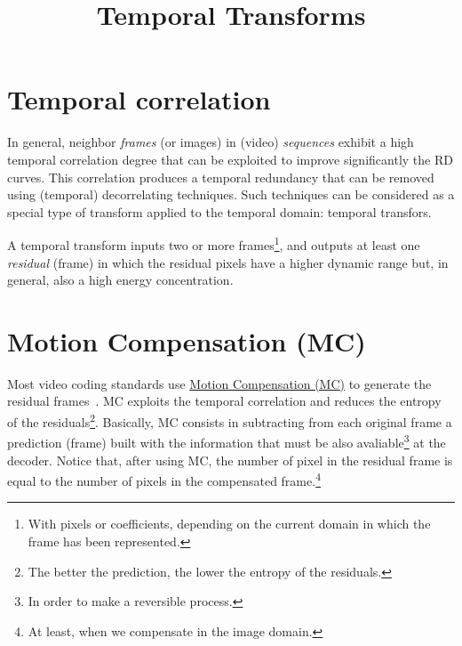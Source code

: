 


\title{Temporal Transforms}

\maketitle
\tableofcontents

\section{Temporal correlation}

In general, neighbor \emph{frames} (or images) in (video)
\emph{sequences} exhibit a high temporal correlation degree that can
be exploited to improve significantly the RD curves. This correlation
produces a temporal redundancy that can be removed using (temporal)
decorrelating techniques. Such techniques can be considered as a
special type of transform applied to the temporal domain: temporal
transfors.

A temporal transform inputs two or more frames\footnote{With pixels or
  coefficients, depending on the current domain in which the frame has
  been represented.}, and outputs at least one \emph{residual} (frame)
in which the residual pixels have a higher dynamic range but, in
general, also a high energy concentration.


\section{Motion Compensation (MC)}

Most video coding standards use
\href{https://en.wikipedia.org/wiki/Motion_compensation}{Motion
  Compensation (MC)} to generate the residual
frames~\cite{vruiz__MC}. MC exploits the temporal correlation and
reduces the entropy of the residuals\footnote{The better the
prediction, the lower the entropy of the residuals.}. Basically, MC
consists in subtracting from each original frame a prediction (frame)
built with the information that must be also avaliable\footnote{In
order to make a reversible process.} at the decoder. Notice that,
after using MC, the number of pixel in the residual frame is equal to
the number of pixels in the compensated frame.\footnote{At least, when
we compensate in the image domain.}

